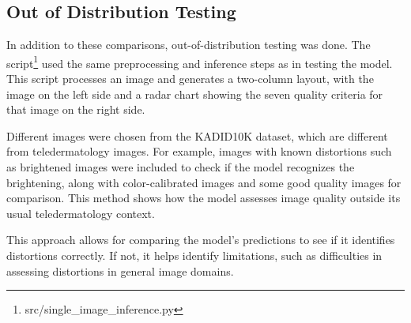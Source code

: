 \subsection{Out of Distribution Testing}
\label{subsec:OOD}
In addition to these comparisons, out-of-distribution testing was done. The script\footnote{src/single\_image\_inference.py} used the same preprocessing and inference steps as in testing the model. This script processes an image and generates a two-column layout, with the image on the left side and a radar chart showing the seven quality criteria for that image on the right side. \par
\vspace{\baselineskip}
\noindent
Different images were chosen from the KADID10K \autocite{KADID10k} dataset, which are different from teledermatology images. For example, images with known distortions such as brightened images were included to check if the model recognizes the brightening, along with color-calibrated images and some good quality images for comparison. This method shows how the model assesses image quality outside its usual teledermatology context. \par
\vspace{\baselineskip}
\noindent
This approach allows for comparing the model’s predictions to see if it identifies distortions correctly. If not, it helps identify limitations, such as difficulties in assessing distortions in general image domains. \par
